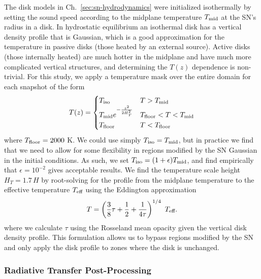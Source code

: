 The disk models in Ch.~\ref{sec:sn-hydrodynamics} were initialized isothermally by setting the sound speed according to the midplane temperature $T_\text{mid}$ at the SN's radius in a \citet{SirkoGoodman03} disk.
In hydrostatic equilibrium an isothermal disk has a vertical density profile that is Gaussian, which is a good approximation for the temperature in passive disks (those heated by an external source).
Active disks (those internally heated) are much hotter in the midplane and have much more complicated vertical structures, and determining the $T(z)$ dependence is non-trivial.
For this study, we apply a temperature mask over the entire domain for each snapshot of the form
\begin{equation}
\label{eqn:temp-profile}
    T(z) =
    \begin{cases}
	T_\text{iso} & T>T_\text{mid} \\
	T_\text{mid} e^{- \frac{z^2}{2 H_T^2}} & T_\text{floor} < T < T_\text{mid} \\
	T_\text{floor} & T<T_\text{floor}
    \end{cases}
\end{equation}
where $T_\text{floor}=2000$ K.
We could use simply $T_\text{iso} = T_\text{mid}$, but in practice we find that we need to allow for some flexibility in regions modified by the SN Gaussian in the initial conditions.
As such, we set $T_\text{iso} = (1+\epsilon) T_\text{mid}$, and find empirically that $\epsilon=10^{-2}$ gives acceptable results.
We find the temperature scale height $H_T=1.7\,H$ by root-solving for the profile from the midplane temperature to the effective temperature $T_\text{eff}$ using the Eddington approximation
\begin{equation}
	T = \left( \frac{3}{8} \tau + \frac{1}{2} + \frac{1}{4\tau} \right)^{1/4}\ \Teff.
\end{equation}
where we calculate $\tau$ using the Rosseland mean opacity given the vertical disk density profile.
This formulation allows us to bypass regions modified by the SN and only apply the disk profile to zones where the disk is unchanged.



%
%
\subsubsection{Radiative Transfer Post-Processing} \label{subsec:rad-transfer}


